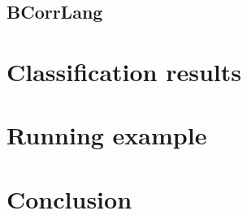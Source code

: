 \documentclass[runningheads]{llncs}
\begin{document}
\subsection{BCorrLang} %

\section{Classification results}




\section{Running example}



\section{Conclusion} \label{sec:conclusion}



\end{document}
